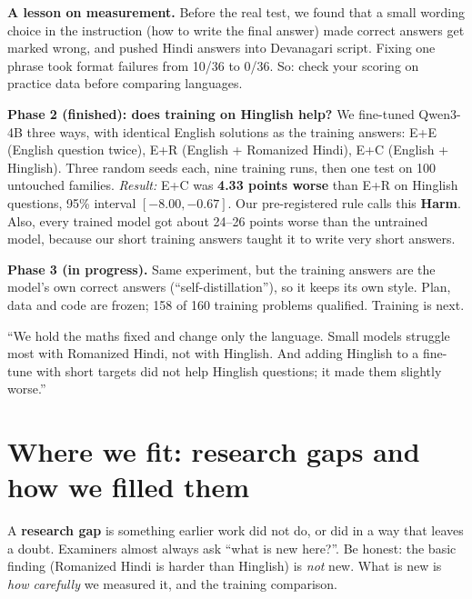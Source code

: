 \documentclass[11pt,a4paper]{article}
\begin{document}
\textbf{A lesson on measurement.} Before the real test, we found that a small wording choice in the instruction (how to write the final answer) made correct answers get marked wrong, and pushed Hindi answers into Devanagari script. Fixing one phrase took format failures from 10/36 to 0/36. So: check your scoring on practice data before comparing languages.

\textbf{Phase 2 (finished): does training on Hinglish help?} We fine-tuned Qwen3-4B three ways, with identical English solutions as the training answers:
E+E (English question twice), E+R (English + Romanized Hindi), E+C (English + Hinglish). Three random seeds each, nine training runs, then one test on 100 untouched families. \emph{Result:} E+C was \textbf{4.33 points worse} than E+R on Hinglish questions, 95\% interval $[-8.00, -0.67]$. Our pre-registered rule calls this \textbf{Harm}. Also, every trained model got about 24--26 points worse than the untrained model, because our short training answers taught it to write very short answers.

\textbf{Phase 3 (in progress).} Same experiment, but the training answers are the model's own correct answers (``self-distillation''), so it keeps its own style. Plan, data and code are frozen; 158 of 160 training problems qualified. Training is next.

\begin{ifasked}
``We hold the maths fixed and change only the language. Small models struggle most with Romanized Hindi, not with Hinglish. And adding Hinglish to a fine-tune with short targets did not help Hinglish questions; it made them slightly worse.''
\end{ifasked}

\section{Where we fit: research gaps and how we filled them}

A \textbf{research gap} is something earlier work did not do, or did in a way that leaves a doubt. Examiners almost always ask ``what is new here?''. Be honest: the basic finding (Romanized Hindi is harder than Hinglish) is \emph{not} new. What is new is \emph{how carefully} we measured it, and the training comparison.
\end{document}
